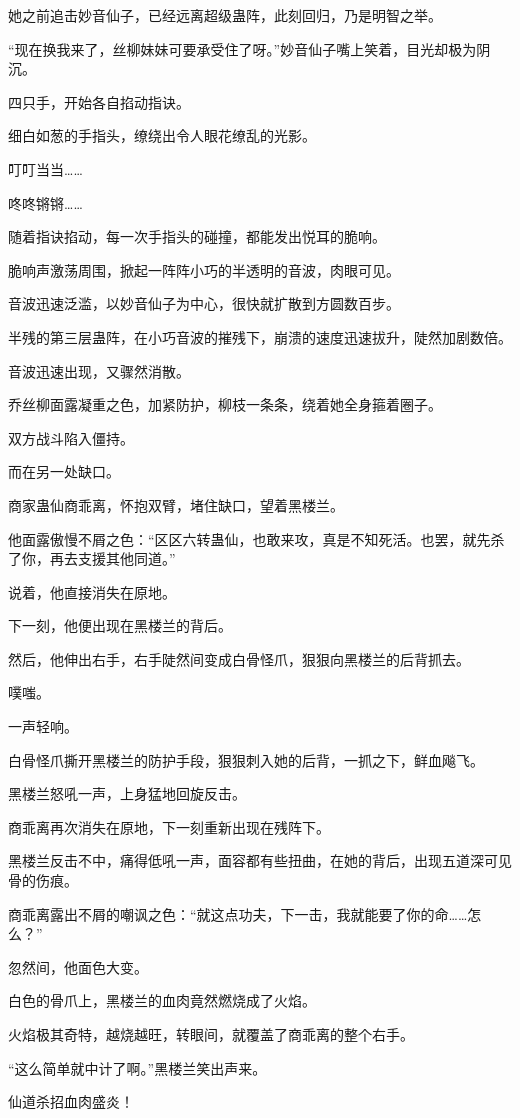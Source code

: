 \begin{this_body}
她之前追击妙音仙子，已经远离超级蛊阵，此刻回归，乃是明智之举。

“现在换我来了，丝柳妹妹可要承受住了呀。”妙音仙子嘴上笑着，目光却极为阴沉。

四只手，开始各自掐动指诀。

细白如葱的手指头，缭绕出令人眼花缭乱的光影。

叮叮当当……

咚咚锵锵……

随着指诀掐动，每一次手指头的碰撞，都能发出悦耳的脆响。

脆响声激荡周围，掀起一阵阵小巧的半透明的音波，肉眼可见。

音波迅速泛滥，以妙音仙子为中心，很快就扩散到方圆数百步。

半残的第三层蛊阵，在小巧音波的摧残下，崩溃的速度迅速拔升，陡然加剧数倍。

音波迅速出现，又骤然消散。

乔丝柳面露凝重之色，加紧防护，柳枝一条条，绕着她全身箍着圈子。

双方战斗陷入僵持。

而在另一处缺口。

商家蛊仙商乖离，怀抱双臂，堵住缺口，望着黑楼兰。

他面露傲慢不屑之色：“区区六转蛊仙，也敢来攻，真是不知死活。也罢，就先杀了你，再去支援其他同道。”

说着，他直接消失在原地。

下一刻，他便出现在黑楼兰的背后。

然后，他伸出右手，右手陡然间变成白骨怪爪，狠狠向黑楼兰的后背抓去。

噗嗤。

一声轻响。

白骨怪爪撕开黑楼兰的防护手段，狠狠刺入她的后背，一抓之下，鲜血飚飞。

黑楼兰怒吼一声，上身猛地回旋反击。

商乖离再次消失在原地，下一刻重新出现在残阵下。

黑楼兰反击不中，痛得低吼一声，面容都有些扭曲，在她的背后，出现五道深可见骨的伤痕。

商乖离露出不屑的嘲讽之色：“就这点功夫，下一击，我就能要了你的命……怎么？”

忽然间，他面色大变。

白色的骨爪上，黑楼兰的血肉竟然燃烧成了火焰。

火焰极其奇特，越烧越旺，转眼间，就覆盖了商乖离的整个右手。

“这么简单就中计了啊。”黑楼兰笑出声来。

仙道杀招血肉盛炎！


\end{this_body}
